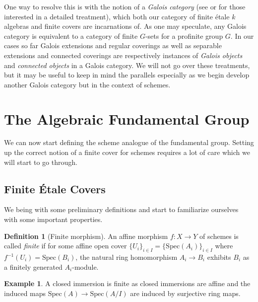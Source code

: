 \documentclass{article}
\theoremstyle{definition}
\newtheorem{definition}[theorem]{Definition}
\newtheorem{example}[theorem]{Example}
\theoremstyle{remark}
\begin{document}
One way to resolve this is with the notion of a \textit{Galois category} (see \cite{grothendieck} or \cite{Lenstra} for those interested in a detailed treatment), which both our category of finite \'etale $k$ algebras and finite covers are incarnations of. 
As one may speculate, any Galois category is equivalent to a category of finite $G$-sets for a profinite group $G$.
In our cases so far Galois extensions and regular coverings as well as separable extensions and connected coverings are respectively instances of \textit{Galois objects} and \textit{connected objects} in a Galois category.
We will not go over these treatments, but it may be useful to keep in mind the parallels especially as we begin develop another Galois category but in the context of schemes.


\section{The Algebraic Fundamental Group}

We can now start defining the scheme analogue of the fundamental group.
Setting up the correct notion of a finite cover for schemes requires a lot of care which we will start to go through.

\subsection{Finite \'Etale Covers}

We being with some preliminary definitions and start to familiarize ourselves with some important properties.

\begin{definition}[Finite morphism]
	An affine morphism $f: X \to Y$ of schemes is called \textit{finite} if for some affine open cover $\{U_i\}_{i \in I}  = \{\text{Spec}(A_i)\}_{i \in I}$ where $f^{-1}(U_i) = \text{Spec}(B_i)$, the natural ring homomorphism $A_i \to B_i$ exhibits $B_i$ as a finitely generated $A_i$-module.
\end{definition}

\begin{example}
	A closed immersion is finite as closed immersions are affine and the induced maps $\text{Spec}(A) \to \text{Spec}(A/I)$ are induced by surjective ring maps.
\end{example}
\end{document}

